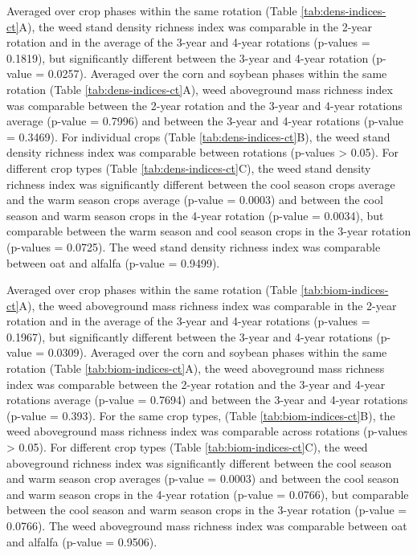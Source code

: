\documentclass[
]{article}
\begin{document}
Averaged over crop phases within the same rotation (Table \ref{tab:dens-indices-ct}A), the weed stand density richness index was comparable in the 2-year rotation and in the average of the 3-year and 4-year rotations (p-values = 0.1819), but significantly different between the 3-year and 4-year rotation (p-value = 0.0257). Averaged over the corn and soybean phases within the same rotation (Table \ref{tab:dens-indices-ct}A), weed aboveground mass richness index was comparable between the 2-year rotation and the 3-year and 4-year rotations average (p-value = 0.7996) and between the 3-year and 4-year rotations (p-value = 0.3469). For individual crops (Table \ref{tab:dens-indices-ct}B), the weed stand density richness index was comparable between rotations (p-values \textgreater{} 0.05). For different crop types (Table \ref{tab:dens-indices-ct}C), the weed stand density richness index was significantly different between the cool season crops average and the warm season crops average (p-value = 0.0003) and between the cool season and warm season crops in the 4-year rotation (p-value = 0.0034), but comparable between the warm season and cool season crops in the 3-year rotation (p-values = 0.0725). The weed stand density richness index was comparable between oat and alfalfa (p-value = 0.9499).

Averaged over crop phases within the same rotation (Table \ref{tab:biom-indices-ct}A), the weed aboveground mass richness index was comparable in the 2-year rotation and in the average of the 3-year and 4-year rotations (p-values = 0.1967), but significantly different between the 3-year and 4-year rotations (p-value = 0.0309). Averaged over the corn and soybean phases within the same rotation (Table \ref{tab:biom-indices-ct}A), the weed aboveground mass richness index was comparable between the 2-year rotation and the 3-year and 4-year rotations average (p-value = 0.7694) and between the 3-year and 4-year rotations (p-value = 0.393). For the same crop types, (Table \ref{tab:biom-indices-ct}B), the weed aboveground mass richness index was comparable across rotations (p-values \textgreater{} 0.05). For different crop types (Table \ref{tab:biom-indices-ct}C), the weed aboveground richness index was significantly different between the cool season and warm season crop averages (p-value = 0.0003) and between the cool season and warm season crops in the 4-year rotation (p-value = 0.0766), but comparable between the cool season and warm season crops in the 3-year rotation (p-value = 0.0766). The weed aboveground mass richness index was comparable between oat and alfalfa (p-value = 0.9506).
\end{document}
